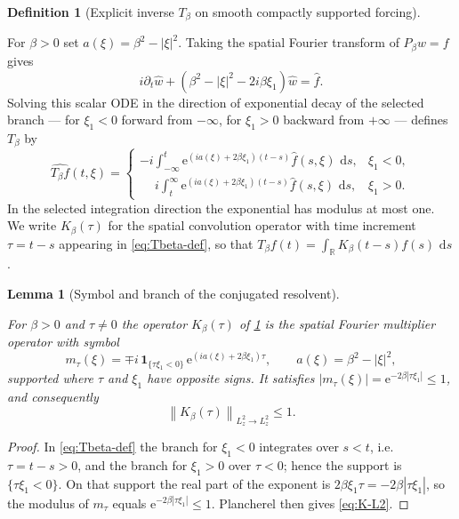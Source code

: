 \documentclass[11pt,oneside]{book}
\providecommand{\uses}[1]{}
\newtheorem{lemma}[theorem]{Lemma}
\theoremstyle{definition}
\newtheorem{definition}[theorem]{Definition}
\theoremstyle{remark}
\newcommand{\R}{\mathbb R}
\newcommand{\1}{\mathbf 1}
\newcommand{\dd}{\,\mathrm d}
\newcommand{\norm}[1]{\left\lVert #1\right\rVert}
\newcommand{\e}{\mathrm e}
\begin{document}
\begin{definition}[Explicit inverse $T_\beta$ on smooth compactly supported forcing]\label{def:Tbeta}
\uses{def:conjugated-operator}
For $\beta>0$ set $a(\xi)=\beta^2-|\xi|^2$. Taking the spatial Fourier transform of
$P_\beta w=f$ gives
\begin{equation}
 i\partial_t\widehat w+(\beta^2-|\xi|^2-2i\beta\xi_1)\widehat w=\widehat f. \label{eq:Pbeta-ODE}
\end{equation}
Solving this scalar ODE in the direction of exponential decay of the selected branch --- for
$\xi_1<0$ forward from $-\infty$, for $\xi_1>0$ backward from $+\infty$ --- defines $T_\beta$
by
\begin{equation}
 \widehat{T_\beta f}(t,\xi)=
 \begin{cases}
 -i\displaystyle\int_{-\infty}^t
   \e^{(ia(\xi)+2\beta\xi_1)(t-s)}\widehat f(s,\xi)\,\dd s, &\xi_1<0,\\[1.0em]
 \phantom{-}i\displaystyle\int_t^{\infty}
   \e^{(ia(\xi)+2\beta\xi_1)(t-s)}\widehat f(s,\xi)\,\dd s, &\xi_1>0.
 \end{cases}                                     \label{eq:Tbeta-def}
\end{equation}
In the selected integration direction the exponential has modulus at most one. We write
$K_\beta(\tau)$ for the spatial convolution operator with time increment $\tau=t-s$
appearing in \eqref{eq:Tbeta-def}, so that $T_\beta f(t)=\int_\R K_\beta(t-s)f(s)\,\dd s$.
\end{definition}

\begin{lemma}[Symbol and branch of the conjugated resolvent]\label{lem:Tbeta-symbol}
\uses{def:Tbeta, def:conjugated-operator}
For $\beta>0$ and $\tau\ne0$ the operator $K_\beta(\tau)$ of \cref{def:Tbeta} is the spatial
Fourier multiplier operator with symbol
\begin{equation}
 m_\tau(\xi)=\mp i\,\1_{\{\tau\xi_1<0\}}\,\e^{(ia(\xi)+2\beta\xi_1)\tau},
 \qquad a(\xi)=\beta^2-|\xi|^2,
\end{equation}
supported where $\tau$ and $\xi_1$ have opposite signs. It satisfies
$|m_\tau(\xi)|=\e^{-2\beta|\tau\xi_1|}\le1$, and consequently
\begin{equation}
 \norm{K_\beta(\tau)}_{L^2_z\to L^2_z}\le1. \label{eq:K-L2}
\end{equation}
\end{lemma}

\begin{proof}
\uses{def:Tbeta}
In \eqref{eq:Tbeta-def} the branch for $\xi_1<0$ integrates over $s<t$, i.e.\ $\tau=t-s>0$,
and the branch for $\xi_1>0$ over $\tau<0$; hence the support is $\{\tau\xi_1<0\}$. On that
support the real part of the exponent is $2\beta\xi_1\tau=-2\beta|\tau\xi_1|$, so the
modulus of $m_\tau$ equals $\e^{-2\beta|\tau\xi_1|}\le1$. Plancherel then gives
\eqref{eq:K-L2}.
\end{proof}
\end{document}
